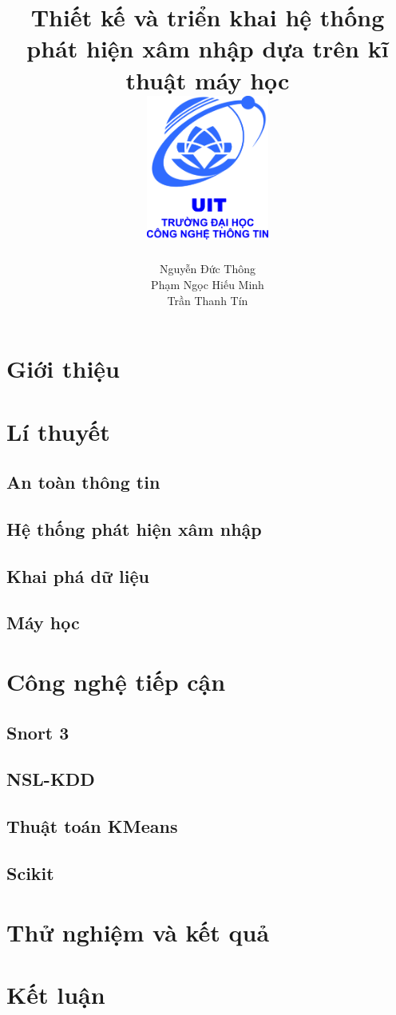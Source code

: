\documentclass[12pt,twoside]{report}
\title{
    {Thiết kế và triển khai hệ thống phát hiện xâm nhập dựa trên kĩ thuật máy học}\\
    {\includegraphics[width=4cm]{logo}}
}
\author{
    Nguyễn Đức Thông
    \\
    Phạm Ngọc Hiếu Minh
    \\
    Trần Thanh Tín
}
\begin{document}
\maketitle
\newpage
\tableofcontents
\listoffigures
\newpage

    \chapter{Giới thiệu}
    
    \newpage
    \chapter{Lí thuyết}
    \section{An toàn thông tin}
    
    \section{Hệ thống phát hiện xâm nhập}
    
    \section{Khai phá dữ liệu}
    
    \section{Máy học}
    
    \newpage
    \chapter{Công nghệ tiếp cận}
    \section{Snort 3}
    
    \section{NSL-KDD}
    
    \section{Thuật toán KMeans}
    
    \section{Scikit}
    
    \newpage
    \chapter{Thử nghiệm và kết quả}
    
    \newpage
    \chapter{Kết luận}
    

\newpage


\end{document}
